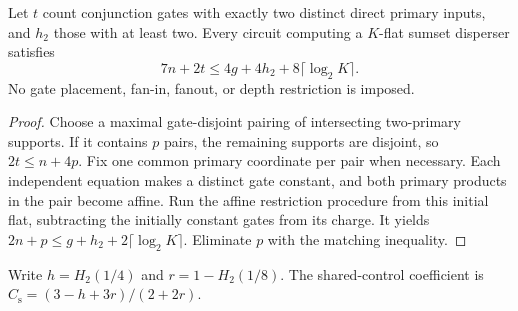 \begin{theorem}
  \label{thm:lowerbounds-algebraic-geometry-shared-controls}
  \leanok
  Let $t$ count conjunction gates with exactly two distinct direct primary
  inputs, and $h_2$ those with at least two. Every circuit computing a
  $K$-flat sumset disperser satisfies
  \[
    7n+2t\le4g+4h_2+8\lceil\log_2K\rceil.
  \]
  No gate placement, fan-in, fanout, or depth restriction is imposed.
\end{theorem}
\begin{proof}
  \leanok
  Choose a maximal gate-disjoint pairing of intersecting two-primary supports.
  If it contains $p$ pairs, the remaining supports are disjoint, so
  $2t\le n+4p$. Fix one common primary coordinate per pair when necessary.
  Each independent equation makes a distinct gate constant, and both primary
  products in the pair become affine. Run the affine restriction procedure
  from this initial flat, subtracting the initially constant gates from its
  charge. It yields $2n+p\le g+h_2+2\lceil\log_2K\rceil$.
  Eliminate $p$ with the matching inequality.
\end{proof}

\begin{definition}
  \label{def:lowerbounds-algebraic-geometry-shared-coefficient}
  \leanok
  Write $h=H_2(1/4)$ and $r=1-H_2(1/8)$. The shared-control coefficient is
  $C_{\mathrm s}=(3-h+3r)/(2+2r)$.
\end{definition}

